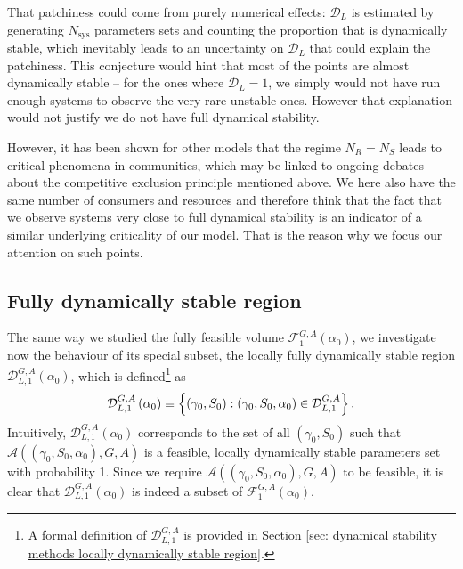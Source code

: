 \documentclass[12pt, titlepage]{report}
\begin{document}
That patchiness could come from purely numerical effects: $\mathcal{D}_L$ is estimated by generating $N_\text{sys}$ parameters sets and counting the proportion that is dynamically stable, which inevitably leads to an uncertainty on $\mathcal{D}_L$ that could explain the patchiness. This conjecture would hint that most of the points are almost dynamically stable -- for the ones where $\mathcal{D}_L=1$, we simply would not have run enough systems to observe the very rare unstable ones. However that explanation would not justify  we do not have full dynamical stability.

However, it has been shown for other models \cite{biroli_marginally_2018} that the regime $N_R=N_S$ leads to critical phenomena in communities, which may be linked to ongoing debates about the competitive exclusion principle mentioned above. We here also have the same number of consumers and resources and therefore think that the fact that we observe systems very close to full dynamical stability is an indicator of a similar underlying criticality of our model. That is the reason why we focus our attention on such points.

\subsection{Fully dynamically stable region}\label{sec: dynamical stability methods fully dynamically stable region}
The same way we studied the fully feasible volume $\mathcal{F}_{1}^{G,A}(\alpha_0)$, we investigate now the behaviour of its special subset, the locally fully dynamically stable region $\mathcal{D}^{G,A}_{L,1}\left(\alpha_0\right)$, which is defined\footnote{A formal definition of $\mathcal{D}^{G,A}_{L,1}$ is provided in Section \ref{sec: dynamical stability methods locally dynamically stable region}.} as
\begin{equation}
\mathcal{D}_{L,1}^{G,A}\left(\alpha_0\right) \equiv \left\{ (\gamma_0, S_0) : (\gamma_0, S_0, \alpha_0) \in \mathcal{D}^{G,A}_{L,1} \right\}.
\end{equation}
 Intuitively, $\mathcal{D}^{G,A}_{L,1}\left(\alpha_0\right)$ corresponds to the set of all $(\gamma_0, S_0)$ such that $\mathcal{A}\left((\gamma_0, S_0, \alpha_0), G, A\right)$ is a feasible, locally dynamically stable parameters set with probability 1. Since we require $\mathcal{A}\left((\gamma_0, S_0, \alpha_0), G, A\right)$ to be feasible, it is clear that $\mathcal{D}^{G,A}_{L,1}\left(\alpha_0\right)$ is indeed a subset of $\mathcal{F}^{G,A}_1\left(\alpha_0\right)$.
\end{document}
